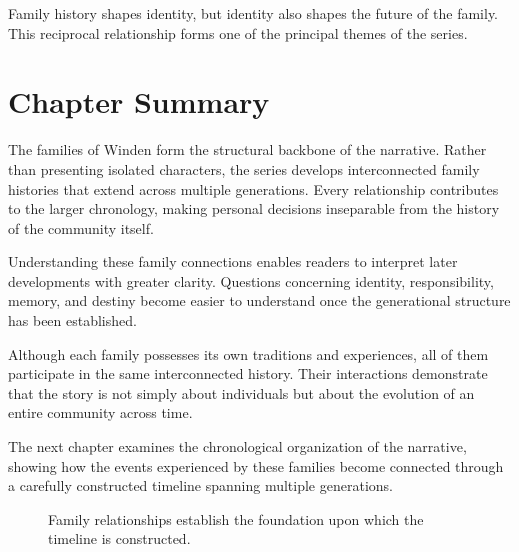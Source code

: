 \documentclass[12pt,oneside,openany]{book}
\begin{document}
\begin{tcolorbox}[colback=green!6,colframe=green!50!black,title=Key Concept]
Family history shapes identity, but identity also shapes the future of the
family. This reciprocal relationship forms one of the principal themes of the
series.
\end{tcolorbox}
\section{Chapter Summary}

The families of Winden form the structural backbone of the narrative. Rather
than presenting isolated characters, the series develops interconnected family
histories that extend across multiple generations. Every relationship
contributes to the larger chronology, making personal decisions inseparable
from the history of the community itself.

Understanding these family connections enables readers to interpret later
developments with greater clarity. Questions concerning identity,
responsibility, memory, and destiny become easier to understand once the
generational structure has been established.

Although each family possesses its own traditions and experiences, all of them
participate in the same interconnected history. Their interactions demonstrate
that the story is not simply about individuals but about the evolution of an
entire community across time.

The next chapter examines the chronological organization of the narrative,
showing how the events experienced by these families become connected through a
carefully constructed timeline spanning multiple generations.

\begin{figure}[H]
\centering
{}

\caption{Family relationships establish the foundation upon which the timeline is constructed.}
\end{figure}
\end{document}
